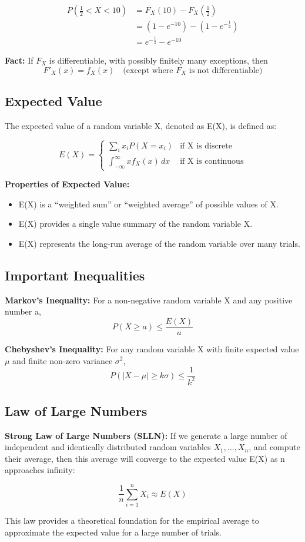 \documentclass{article}
\begin{document}
    \begin{align*}
        P(\frac{1}{2} < X < 10) &= F_X(10) - F_X(\frac{1}{2}) \\
        &= (1 - e^{-10}) - (1 - e^{-\frac{1}{2}}) \\
        &= e^{-\frac{1}{2}} - e^{-10}
    \end{align*}

    \textbf{Fact:} If $F_X$ is differentiable, with possibly finitely many exceptions, then
    \[
        F'_X(x) = f_X(x) \quad \text{(except where $F_X$ is not differentiable)}
    \]

    \subsection*{Expected Value}

    The expected value of a random variable X, denoted as E(X), is defined as:

    \[
    E(X) = 
    \begin{cases} 
        \sum_{i} x_i P(X = x_i) & \text{if X is discrete} \\
        \int_{-\infty}^{\infty} x f_X(x) \, dx & \text{if X is continuous}
    \end{cases}
    \]

    \textbf{Properties of Expected Value:}
    \begin{itemize}
        \item E(X) is a ``weighted sum'' or ``weighted average'' of possible values of X.
        \item E(X) provides a single value summary of the random variable X.
        \item E(X) represents the long-run average of the random variable over many trials.
    \end{itemize}

    \subsection*{Important Inequalities}

    \textbf{Markov's Inequality:}
    For a non-negative random variable X and any positive number a,
    \[
    P(X \geq a) \leq \frac{E(X)}{a}
    \]

    \textbf{Chebyshev's Inequality:}
    For any random variable X with finite expected value $\mu$ and finite non-zero variance $\sigma^2$,
    \[
    P(|X - \mu| \geq k\sigma) \leq \frac{1}{k^2}
    \]

    \subsection*{Law of Large Numbers}

    \textbf{Strong Law of Large Numbers (SLLN):} 
    If we generate a large number of independent and identically distributed random variables $X_1, \ldots, X_n$, and compute their average, then this average will converge to the expected value E(X) as n approaches infinity:

    \[
    \frac{1}{n}\sum_{i=1}^{n} X_i \approx E(X)
    \]

    This law provides a theoretical foundation for the empirical average to approximate the expected value for a large number of trials.
\end{document}
